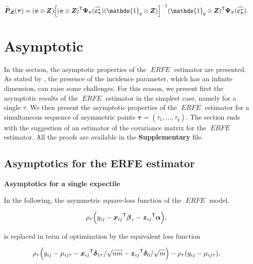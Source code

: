 \documentclass[15pt,a4paper]{article}
\newcommand{\transpose}{{}^{\text{\sffamily T}}}
\DeclareMathOperator{\ERFE}{\textit{ERFE}}
\begin{document}
\begin{equation*}
    \widehat{\boldsymbol{P}}_{\boldsymbol{Z}}(\boldsymbol{\tau})=(\boldsymbol{v}\otimes\boldsymbol{Z})
\Big[(\boldsymbol{v}\otimes\boldsymbol{Z})\transpose  \boldsymbol{\Psi}_{\boldsymbol{\tau}}(\widehat{\boldsymbol{\varepsilon}_{\boldsymbol{\tau}}^{*}})
(\mathds{1}_q\otimes\boldsymbol{Z})\Big]^{-1}(\mathds{1}_q\otimes\boldsymbol{Z})\transpose \boldsymbol{\Psi}_{\boldsymbol{\tau}}(\widehat{\boldsymbol{\varepsilon}_{\boldsymbol{\tau}}^{*}}).
\end{equation*}


\section{Asymptotic}\label{asymp_erfe}

In this section, the asymptotic properties of the $\ERFE$ estimator are presented. As stated by \citet{koenker_quantile_2004}, the presence of the incidence parameter, which has an infinite dimension, can raise some challenges. For this reason, we present first the asymptotic results of the $\ERFE$ estimator in the simplest case, namely for a single \(\tau.\) We then present the asymptotic properties of the $\ERFE$ estimator
for a simultaneous sequence of asymmetric points \(\boldsymbol{\tau}=(\tau_1,\ldots,\tau_q).\) The section ends with the suggestion of an estimator of the covariance matrix for the $\ERFE$ estimator. All the proofs are available in the \textbf{Supplementary} file.

\subsection{Asymptotics for the ERFE estimator}

\textbf{Asymptotics for a single expectile }

In the following, the asymmetric square-loss function of the $\ERFE$ model,

\begin{equation*}
\rho_{\tau}\Big(y_{ij}-\boldsymbol{x}_{ij}\transpose\boldsymbol{\beta}_{\tau} - 
\boldsymbol{z}_{ij}\transpose\boldsymbol{\alpha}\Big),
\end{equation*}

is replaced in term of optimization by the equivalent loss function

\begin{equation*}
\rho_{\tau}\Big( y_{ij}-\mu_{ij\tau}-\boldsymbol{x}_{ij}\transpose
\boldsymbol{\delta}_{1\tau}/\sqrt{nm} - \boldsymbol{z}_{ij}\transpose\boldsymbol{\delta}_0/\sqrt{m}\Big)
-\rho_{\tau}(y_{ij}-\mu_{ij\tau}),
\end{equation*}
\end{document}

